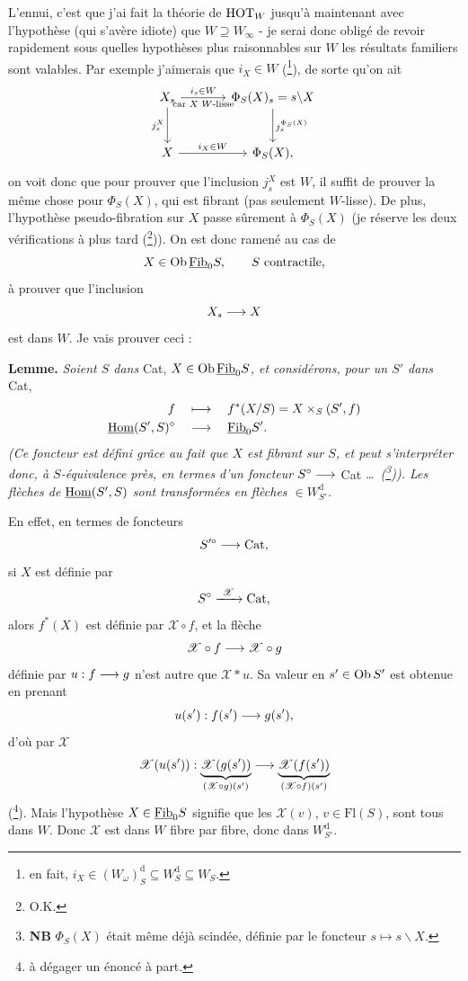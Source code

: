 L'ennui, c'est que j'ai fait la théorie de $\mathrm{HOT}_W$ jusqu'à maintenant avec l'hypothèse (qui s'avère idiote) que $W\supseteq W_\infty$ - je serai donc obligé de revoir rapidement sous quelles hypothèses plus raisonnables sur $W$ les résultats familiers sont valables. Par exemple j'aimerais que $i_X\in W$ (\footnote[50]{en fait, $i_X\in(W_\omega)^{\mathrm{d}}_S\subseteq W^{\mathrm{d}}_S\subseteq W_S$.}), de sorte qu'on ait
\[
\begin{tikzcd}[column sep=large, row sep=large]
X_s \arrow[r, "i_s\in W", "\text{car $X$ $W$-lisse}"'] \arrow[d, "j^X_s"'] & \Phi_S(X)_s=s\backslash X \arrow[d, "j_s^{\Phi_S(X)}"] \\
X \arrow[r, "i_X\in W"] & \Phi_S(X),
\end{tikzcd}
\]
on voit donc que pour prouver que l'inclusion $j^X_s$ est $W$, il suffit de prouver la même chose pour $\Phi_S(X)$, qui est fibrant (pas seulement $W$-lisse). De plus, l'hypothèse pseudo-fibration sur $X$ passe sûrement à $\Phi_S(X)$ (je réserve les deux vérifications à plus tard (\footnote[51]{O.K.})). On est donc ramené au cas de
\[ X\in\operatorname{Ob}\underline{\mathrm{Fib}}_0S, \qquad S\text{ contractile,} \]
à prouver que l'inclusion
\[ X_s\longrightarrow X \]
est dans $W$. Je vais prouver ceci :

\textbf{Lemme.} \textit{Soient $S$ dans} Cat, \textit{$X\in\operatorname{Ob}\underline{\mathrm{Fib}}_0S$, et considérons, pour un $S'$ dans} Cat,
\[
\begin{aligned}
f &\quad\longmapsto\quad f^*(X/S)=X\times_S(S',f)\\
\underline{\mathrm{Hom}}(S',S)^{\circ} &\quad\longrightarrow\quad \underline{\mathrm{Fib}}_0S'.
\end{aligned}
\]
\textit{(Ce foncteur est défini grâce au fait que $X$ est fibrant sur $S$, et peut s'interpréter donc, à $S$-équivalence près, en termes d'un foncteur $S^{\circ}\longrightarrow$} Cat \textit{\dots\ (\footnote[52]{\textbf{NB} $\Phi_S(X)$ était même déjà scindée, définie par le foncteur $s\longmapsto s\backslash X$.})). Les flèches de $\underline{\mathrm{Hom}}(S',S)$ sont transformées en flèches $\in W^{\mathrm{d}}_{S'}$.}

En effet, en termes de foncteurs
\[ S'^{\circ}\longrightarrow\mathrm{Cat}, \]
si $X$ est définie par
\[ S^{\circ}\xrightarrow{\ \mathscr{X}\ }\Cat, \]
alors $f^*(X)$ est définie par $\mathscr{X}\circ f$, et la flèche
\[ \mathscr{X}\circ f\longrightarrow\mathscr{X}\circ g \]
définie par $u : f\longrightarrow g$ n'est autre que $\mathscr{X}*u$. Sa valeur en $s'\in\operatorname{Ob} S'$ est obtenue en prenant
\[ u(s') : f(s')\longrightarrow g(s'), \]
d'où par $\mathscr{X}$
\[ \mathscr{X}(u(s')) : \underbrace{\mathscr{X}(g(s'))}_{(\mathscr{X}\circ g)(s')}\longrightarrow\underbrace{\mathscr{X}(f(s'))}_{(\mathscr{X}\circ f)(s')} \]
(\footnote[53]{à dégager un énoncé à part.}). Mais l'hypothèse $X\in\underline{\mathrm{Fib}}_0S$ signifie que les $\mathscr{X}(v)$, $v\in\mathrm{Fl}(S)$, sont tous dans $W$. Donc
$\mathscr{X}$ est dans $W$ fibre par fibre, donc dans $W^{\mathrm{d}}_{S'}$.

